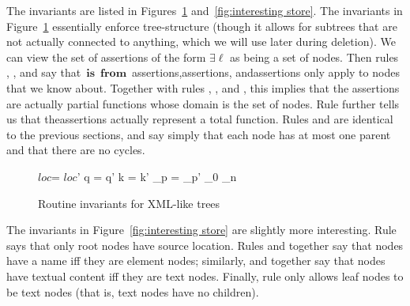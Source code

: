\documentclass{article}
\newcommand{\mbf}[1]{\ensuremath{\mathbf{#1}}}
\newcommand{\loc}{\ensuremath{\mathit{loc}}\xspace}
\newcommand{\isfrom}{\ \mbf{is}\ \mbf{from}\ }
\begin{document}
The invariants are listed in Figures~\ref{fig:routine store}
and~\ref{fig:interesting store}. The invariants in
Figure~\ref{fig:routine store} essentially enforce tree-structure (though it
allows for subtrees that are not actually connected to anything, which we
will use later during deletion). We can view the set of assertions of the
form $\exists\ell$ as being a set of nodes. Then rules ,
, and  say that\isfrom assertions,\named assertions,
and\has assertions only apply to nodes that we know about. Together with
rules , , and , this implies that the
assertions are actually partial functions whose domain is the set of nodes.
Rule  further tells us that the\has assertions actually
represent a total function. Rules  and  are identical
to the previous sections, and say simply that each node has at most one
parent and that there are no cycles.

\begin{figure}
    \infrule[DomLoc]{\ell\isfrom\loc}{\exists\ell}
    \vspace{2ex}
    \vspace{2ex}
    \vspace{2ex}
    \infrule[FuncLoc]
        {\ell\isfrom\loc \andalso \ell\isfrom\loc'}
        {\loc = \loc'}
    \vspace{2ex}
        {q = q'}
    \vspace{2ex}
        {k = k'}
    \vspace{2ex}
    \vspace{2ex}
        {\ell_p = \ell_p'}
    \vspace{2ex}
        {\ell_0 \ne \ell_n}
    \caption{Routine invariants for XML-like trees}
    \label{fig:routine store}
\end{figure}

The invariants in Figure~\ref{fig:interesting store} are slightly more
interesting. Rule  says that only root nodes have source
location. Rules  and  together say that nodes
have a name iff they are element nodes; similarly,  and
 together say that nodes have textual content iff they are
text nodes. Finally, rule  only allows leaf nodes to be text
nodes (that is, text nodes have no children).
\end{document}
